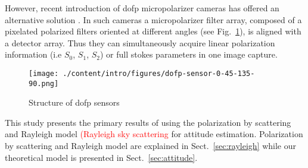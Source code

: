 However, recent introduction of \gls{dofp} micropolarizer cameras has offered
an alternative solution \cite{nordin1999micropolarizer, nordin1999diffractive,
  millerd2006pixelated}.  In such cameras a micropolarizer filter array,
composed of a pixelated polarized filters oriented at different angles (see
Fig.~\ref{fig:dofp-sensor}), is aligned with a detector array. Thus they can
simultaneously acquire linear polarization information (i.e $S_0$, $S_1$,
$S_2$) or full stokes parameters in one image capture.

\begin{figure}
  \centering
  \texttt{[image: ./content/intro/figures/dofp-sensor-0-45-135-90.png]}
  \label{fig:dofp-sensor}
  \caption{Structure of \gls{dofp} sensors}
\end{figure}

This study presents the primary results of using the polarization by scattering
and Rayleigh model \textcolor{red}{(Rayleigh sky scattering} for attitude estimation.
Polarization by scattering and Rayleigh model are explained in
Sect.~\ref{sec:rayleigh} while our theoretical model is presented in
Sect.~\ref{sec:attitude}.























